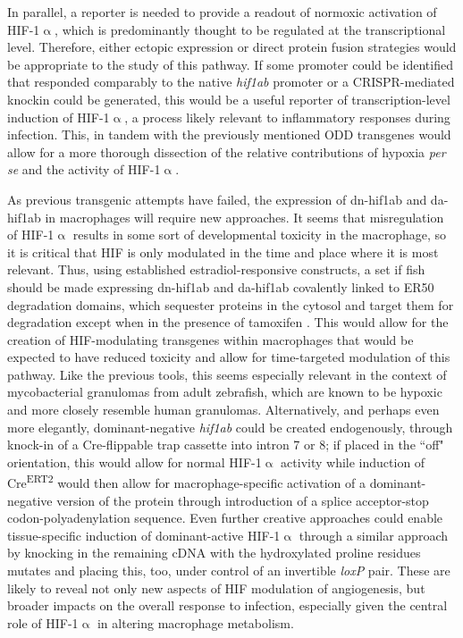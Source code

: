 In parallel, a reporter is needed to provide a readout of normoxic activation of HIF\hyp{}1$\upalpha$, which is predominantly thought to be regulated at the transcriptional level. Therefore, either ectopic expression or direct protein fusion strategies would be appropriate to the study of this pathway. If some promoter could be identified that responded comparably to the native \textit{hif1ab} promoter or a CRISPR\hyp{}mediated knockin could be generated, this would be a useful reporter of transcription\hyp{}level induction of HIF\hyp{}1$\upalpha$, a process likely relevant to inflammatory responses during infection.  This, in tandem with the previously mentioned ODD transgenes would allow for a more thorough dissection of the relative contributions of hypoxia \textit{per se} and the activity of HIF\hyp{}1$\upalpha$.

As previous transgenic attempts have failed, the expression of dn\hyp{}hif1ab and da\hyp{}hif1ab in macrophages will require new approaches. It seems that misregulation of HIF\hyp{}1$\upalpha$ results in some sort of developmental toxicity in the macrophage, so it is critical that HIF is only modulated in the time and place where it is most relevant. Thus, using established estradiol\hyp{}responsive constructs, a set if fish should be made expressing dn\hyp{}hif1ab and da\hyp{}hif1ab covalently linked to ER50 degradation domains, which sequester proteins in the cytosol and target them for degradation except when in the presence of tamoxifen \citep{Miyazaki2012}. This would allow for the creation of HIF\hyp{}modulating transgenes within macrophages that would be expected to have reduced toxicity and allow for time\hyp{}targeted modulation of this pathway. Like the previous tools, this seems especially relevant in the context of mycobacterial granulomas from adult zebrafish, which are known to be hypoxic and more closely resemble human granulomas. Alternatively, and perhaps even more elegantly, dominant\hyp{}negative \textit{hif1ab} could be created endogenously, through knock\hyp{}in of a Cre\hyp{}flippable trap cassette into intron 7 or 8; if placed in the ``off" orientation, this would allow for normal HIF\hyp{}1$\upalpha$ activity while induction of Cre\textsuperscript{ERT2} would then allow for macrophage\hyp{}specific activation of a dominant\hyp{}negative version of the protein through introduction of a splice acceptor\hyp{}stop codon\hyp{}polyadenylation sequence. Even further creative approaches could enable tissue\hyp{}specific induction of dominant\hyp{}active HIF\hyp{}1$\upalpha$ through a similar approach by knocking in the remaining cDNA with the hydroxylated proline residues mutates and placing this, too, under control of an invertible \textit{loxP} pair. These are likely to reveal not only new aspects of HIF modulation of angiogenesis, but broader impacts on the overall response to infection, especially given the central role of HIF\hyp{}1$\upalpha$ in altering macrophage metabolism.


